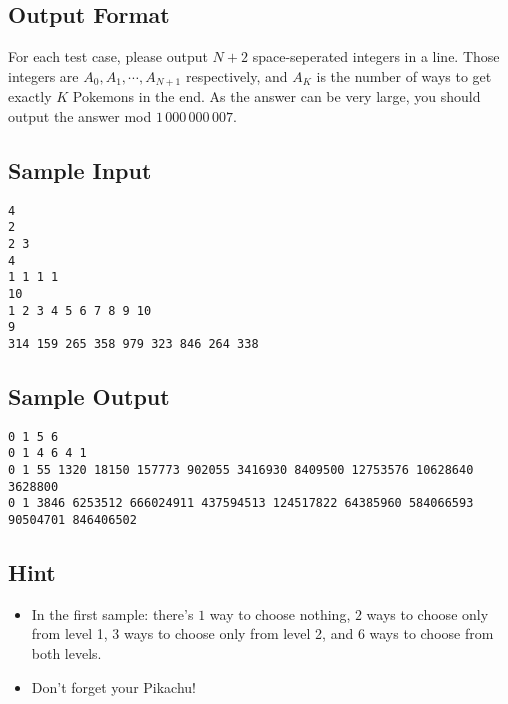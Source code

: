 \subsection{Output Format}\label{output-format}

For each test case, please output $N+2$ space-seperated integers in a line.
Those integers are $A_0, A_1, \cdots, A_{N+1}$ respectively, and $A_K$ is the number of ways to get exactly $K$ Pokemons in the end. As the answer can be very large, you should output the answer mod $1\,000\,000\,007$.

\newpage

\subsection{Sample Input}\label{sample-input}

\begin{verbatim}
4
2
2 3
4
1 1 1 1
10
1 2 3 4 5 6 7 8 9 10
9
314 159 265 358 979 323 846 264 338
\end{verbatim}

\subsection{Sample Output}\label{sample-output}

\begin{verbatim}
0 1 5 6
0 1 4 6 4 1
0 1 55 1320 18150 157773 902055 3416930 8409500 12753576 10628640 3628800
0 1 3846 6253512 666024911 437594513 124517822 64385960 584066593 90504701 846406502
\end{verbatim}

\subsection{Hint}\label{hint}

\begin{itemize}
\tightlist
\item
  In the first sample: there's $1$ way to choose nothing, $2$ ways to choose only from level 1, $3$ ways to choose only from level 2, and $6$ ways to choose from both levels.
\item
  Don't forget your Pikachu!
\end{itemize}
